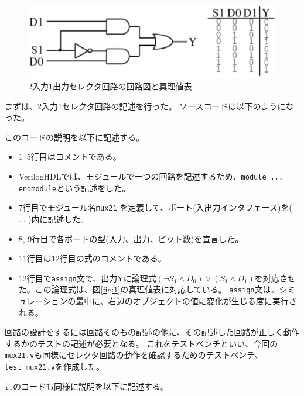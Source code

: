 \documentclass[uplatex]{jsarticle}
\begin{document}
\begin{figure}[htb]
  \begin{center}
    \includegraphics[width=13cm]{images/fig01.eps}
    \caption{2入力1出力セレクタ回路の回路図と真理値表}
    \label{fig:01}
  \end{center}
\end{figure}

まずは、2入力1セレクタ回路の記述を行った。
ソースコードは以下のようになった。



このコードの説明を以下に記述する。

\begin{itemize}
  \item 1~5行目はコメントである。
  \item VerilogHDLでは、モジュールで一つの回路を記述するため、{\tt module ... endmodule}という記述をした。
  \item 7行目でモジュール名{\tt mux21} を定義して、ポート(入出力インタフェース)を( ... )内に記述した。
  \item 8, 9行目で各ポートの型(入力、出力、ビット数)を宣言した。
  \item 11行目は12行目の式のコメントである。
  \item 
    12行目で{\tt assign}文で、出力Yに論理式$(\lnot S_1 \land D_0) \lor (S_1 \land D_1)$を対応させた。この論理式は、図\ref{fig:1}の真理値表に対応している。
    {\tt assign}文は、シミュレーションの最中に、右辺のオブジェクトの値に変化が生じる度に実行される。
\end{itemize}

回路の設計をするには回路そのもの記述の他に、その記述した回路が正しく動作するかのテストの記述が必要となる。
これをテストベンチといい、今回の{\tt mux21.v}も同様にセレクタ回路の動作を確認するためのテストベンチ、{\tt test\_mux21.v}を作成した。



このコードも同様に説明を以下に記述する。   
\end{document}

